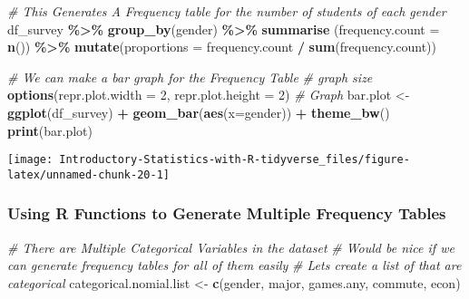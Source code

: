 \documentclass[
]{book}
\newenvironment{Shaded}{\begin{snugshade}}{\end{snugshade}}
\newcommand{\CommentTok}[1]{\textcolor[rgb]{0.56,0.35,0.01}{\textit{#1}}}
\newcommand{\DataTypeTok}[1]{\textcolor[rgb]{0.13,0.29,0.53}{#1}}
\newcommand{\DecValTok}[1]{\textcolor[rgb]{0.00,0.00,0.81}{#1}}
\newcommand{\KeywordTok}[1]{\textcolor[rgb]{0.13,0.29,0.53}{\textbf{#1}}}
\newcommand{\NormalTok}[1]{#1}
\newcommand{\OperatorTok}[1]{\textcolor[rgb]{0.81,0.36,0.00}{\textbf{#1}}}
\newcommand{\StringTok}[1]{\textcolor[rgb]{0.31,0.60,0.02}{#1}}
\begin{document}
\begin{Shaded}
\begin{Highlighting}[]
\CommentTok{\# This Generates A Frequency table for the number of students of each gender}
\NormalTok{df\_survey }\OperatorTok{\%\textgreater{}\%}
\StringTok{    }\KeywordTok{group\_by}\NormalTok{(gender) }\OperatorTok{\%\textgreater{}\%}
\StringTok{    }\KeywordTok{summarise}\NormalTok{ (}\DataTypeTok{frequency.count =} \KeywordTok{n}\NormalTok{()) }\OperatorTok{\%\textgreater{}\%}
\StringTok{      }\KeywordTok{mutate}\NormalTok{(}\DataTypeTok{proportions =}\NormalTok{ frequency.count }\OperatorTok{/}\StringTok{ }\KeywordTok{sum}\NormalTok{(frequency.count))}
\end{Highlighting}
\end{Shaded}

\begin{Shaded}
\begin{Highlighting}[]
\CommentTok{\# We can make a bar graph for the Frequency Table}
\CommentTok{\# graph size}
\KeywordTok{options}\NormalTok{(}\DataTypeTok{repr.plot.width =} \DecValTok{2}\NormalTok{, }\DataTypeTok{repr.plot.height =} \DecValTok{2}\NormalTok{)}
\CommentTok{\# Graph}
\NormalTok{bar.plot \textless{}{-}}\StringTok{ }\KeywordTok{ggplot}\NormalTok{(df\_survey) }\OperatorTok{+}
\StringTok{    }\KeywordTok{geom\_bar}\NormalTok{(}\KeywordTok{aes}\NormalTok{(}\DataTypeTok{x=}\NormalTok{gender)) }\OperatorTok{+}
\StringTok{    }\KeywordTok{theme\_bw}\NormalTok{()}
\KeywordTok{print}\NormalTok{(bar.plot)}
\end{Highlighting}
\end{Shaded}

\begin{center}\texttt{[image: Introductory-Statistics-with-R-tidyverse\_files/figure-latex/unnamed-chunk-20-1]} \end{center}

\hypertarget{using-r-functions-to-generate-multiple-frequency-tables}{%
\subsubsection{Using R Functions to Generate Multiple Frequency Tables}\label{using-r-functions-to-generate-multiple-frequency-tables}}

\begin{Shaded}
\begin{Highlighting}[]
\CommentTok{\# There are Multiple Categorical Variables in the dataset}
\CommentTok{\# Would be nice if we can generate frequency tables for all of them easily}
\CommentTok{\# Let\textquotesingle{}s create a list of  that are categorical}
\NormalTok{categorical.nomial.list \textless{}{-}}\StringTok{ }\KeywordTok{c}\NormalTok{(}\StringTok{\textquotesingle{}gender\textquotesingle{}}\NormalTok{, }\StringTok{\textquotesingle{}major\textquotesingle{}}\NormalTok{, }\StringTok{\textquotesingle{}games.any\textquotesingle{}}\NormalTok{, }\StringTok{\textquotesingle{}commute\textquotesingle{}}\NormalTok{, }\StringTok{\textquotesingle{}econ\textquotesingle{}}\NormalTok{)}
\end{Highlighting}
\end{Shaded}
\end{document}
